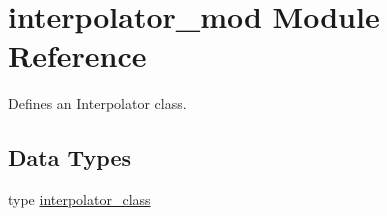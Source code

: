 \hypertarget{namespaceinterpolator__mod}{}\section{interpolator\+\_\+mod Module Reference}
\label{namespaceinterpolator__mod}


Defines an Interpolator class.  


\subsection*{Data Types}
\begin{DoxyCompactItemize}
\item 
type \mbox{\hyperlink{structinterpolator__mod_1_1interpolator__class}{interpolator\+\_\+class}}
\end{DoxyCompactItemize}
